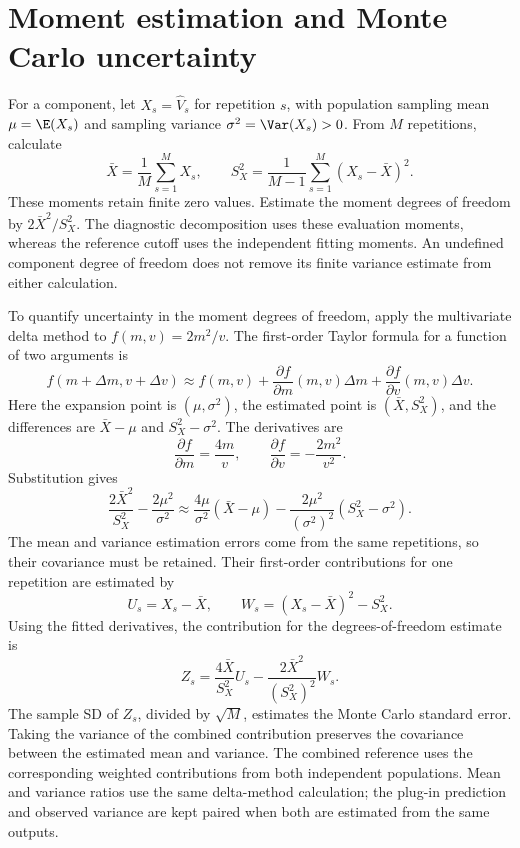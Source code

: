 \section{Moment estimation and Monte Carlo uncertainty}
\label{sec:moment-uncertainty}

For a component, let \(X_s=\widehat V_s\) for repetition \(s\), with
population sampling mean \(\mu=\E(X_s)\) and sampling variance
\(\sigma^2=\Var(X_s)>0\). From \(M\) repetitions, calculate
\begin{equation}
 \bar X=\frac1M\sum_{s=1}^M X_s,\qquad
 S_X^2=\frac1{M-1}\sum_{s=1}^M(X_s-\bar X)^2.
\end{equation}
These moments retain finite zero values. Estimate the moment degrees of
freedom by \(2\bar X^2/S_X^2\). The diagnostic decomposition uses
these evaluation moments, whereas the reference cutoff uses the
independent fitting moments. An undefined component degree of freedom
does not remove its finite variance estimate from either calculation.

To quantify uncertainty in the moment degrees of freedom, apply the
multivariate delta method to
\(f(m,v)=2m^2/v\). The first-order Taylor formula for a function of two
arguments is
\begin{equation}
 f(m+\Delta m,v+\Delta v)
 \approx f(m,v)+\frac{\partial f}{\partial m}(m,v)\Delta m
                +\frac{\partial f}{\partial v}(m,v)\Delta v.
\end{equation}
Here the expansion point is \((\mu,\sigma^2)\), the estimated point is
\((\bar X,S_X^2)\), and the differences are \(\bar X-\mu\) and
\(S_X^2-\sigma^2\). The derivatives are
\begin{equation}
 \frac{\partial f}{\partial m}=\frac{4m}{v},\qquad
 \frac{\partial f}{\partial v}=-\frac{2m^2}{v^2}.
\end{equation}
Substitution gives
\begin{equation}
 \frac{2\bar X^2}{S_X^2}-\frac{2\mu^2}{\sigma^2}
 \approx\frac{4\mu}{\sigma^2}(\bar X-\mu)
       -\frac{2\mu^2}{(\sigma^2)^2}(S_X^2-\sigma^2).
\end{equation}
The mean and variance estimation errors come from the same repetitions,
so their covariance must be retained. Their first-order contributions
for one repetition are estimated by
\begin{equation}
 U_s=X_s-\bar X,\qquad W_s=(X_s-\bar X)^2-S_X^2.
\end{equation}
Using the fitted derivatives, the contribution for the degrees-of-freedom
estimate is
\begin{equation}
 Z_s=\frac{4\bar X}{S_X^2}U_s
       -\frac{2\bar X^2}{(S_X^2)^2}W_s.
 \label{eq:moment-df-mc-contribution}
\end{equation}
The sample SD of \(Z_s\), divided by \(\sqrt M\), estimates the Monte
Carlo standard error. Taking the variance of the combined contribution
preserves the covariance between the estimated mean and variance. The
combined reference uses the corresponding weighted contributions from
both independent populations. Mean and variance ratios use the same
delta-method calculation; the plug-in prediction and observed variance
are kept paired when both are estimated from the same outputs.

